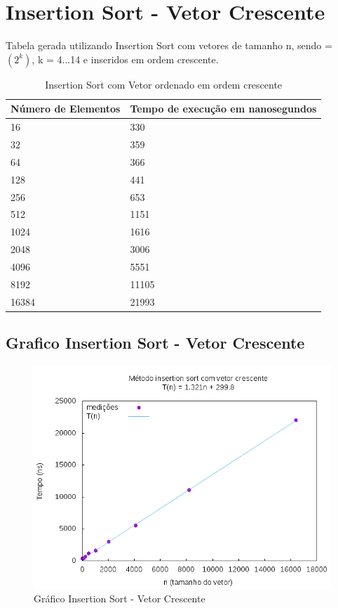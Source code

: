 \documentclass[12pt,a4paper,twoside]{report}
\begin{document}
\section{Insertion Sort - Vetor Crescente}
Tabela gerada utilizando Insertion Sort com vetores de tamanho n, sendo = $(2^k)$, k = 4...14 e inseridos em ordem crescente.

\begin{table}[H]
\centering
\caption{Insertion Sort com Vetor ordenado em ordem crescente}
\label{my-label}
\begin{tabular}{|l|l|}
\hline
\multicolumn{1}{|c|}{\textbf{Número de Elementos}} & \multicolumn{1}{c|}{\textbf{Tempo de execução em nanosegundos}} \\ \hline
16 & 330 \\ \hline
32 & 359 \\ \hline
64 & 366 \\ \hline
128 & 441 \\ \hline
256 & 653 \\ \hline
512 & 1151 \\ \hline
1024 & 1616 \\ \hline
2048 & 3006 \\ \hline
4096 & 5551 \\ \hline
8192 & 11105 \\ \hline
16384 & 21993 \\ \hline
\end{tabular}
\end{table}

\subsection{Grafico Insertion Sort - Vetor Crescente}
\begin{figure}[H]
    \centering
    \includegraphics[width=0.7\linewidth]{graficos/Insertion/vIntCrescente/vIntCrescente.png}
  \caption{Gráfico Insertion Sort - Vetor Crescente}
\end{figure}
\end{document}
